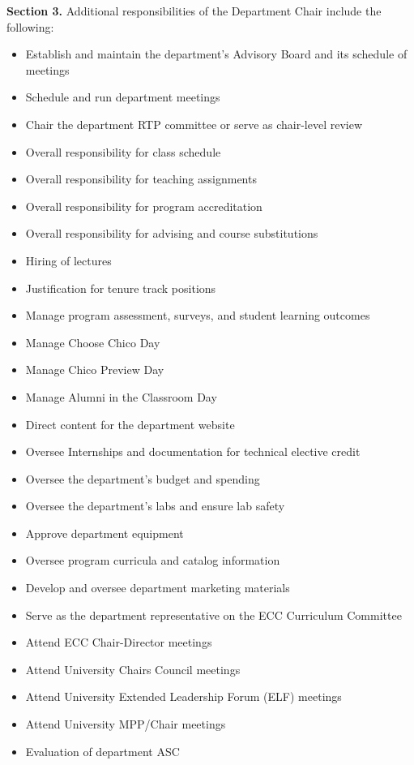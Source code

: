 \documentclass{scrartcl}
\begin{document}
\textbf{Section 3.} Additional responsibilities of the Department Chair include the following:
\begin{itemize}
\item Establish and maintain the department’s Advisory Board and its schedule of meetings
\item Schedule and run department meetings
\item Chair the department RTP committee or serve as chair-level review
\item Overall responsibility for class schedule
\item Overall responsibility for teaching assignments
\item Overall responsibility for program accreditation
\item Overall responsibility for advising and course substitutions
\item Hiring of lectures
\item Justification for tenure track positions
\item Manage program assessment, surveys, and student learning outcomes
\item Manage Choose Chico Day
\item Manage Chico Preview Day
\item Manage Alumni in the Classroom Day
\item Direct content for the department website
\item Oversee Internships and documentation for technical elective credit
\item Oversee the department’s budget and spending
\item Oversee the department’s labs and ensure lab safety
\item Approve department equipment
\item Oversee program curricula and catalog information
\item Develop and oversee department marketing materials
\item Serve as the department representative on the ECC Curriculum Committee
\item Attend ECC Chair-Director meetings
\item Attend University Chairs Council meetings
\item Attend University Extended Leadership Forum (ELF) meetings
\item Attend University MPP/Chair meetings
\item Evaluation of department ASC
\end{itemize}
\end{document}
